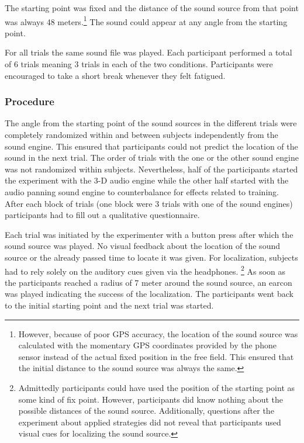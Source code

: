 \documentclass[journal]{IEEEtran}
\begin{document}
The starting point was fixed and the distance of the sound source from that point was always 48 meters.\footnote{However, because of poor GPS accuracy, the location of the sound source was calculated with the momentary GPS coordinates provided by the phone sensor instead of the actual fixed position in the free field. This ensured that the initial distance to the sound source was always the same.} The sound could appear at any angle from the starting point.

For all trials the same sound file was played. Each participant performed a total of 6 trials meaning 3 trials in each of the two conditions. Participants were encouraged to take a short break whenever they felt fatigued.

\subsubsection{Procedure}
The angle from the starting point of the sound sources in the different trials were completely randomized within and between subjects independently from the sound engine. This ensured that participants could not predict the location of the sound in the next trial. The order of trials with the one or the other sound engine was not randomized within subjects. Nevertheless, half of the participants started the experiment with the 3-D audio engine while the other half started with the audio panning sound engine to counterbalance for effects related to training. After each block of trials (one block were 3 trials with one of the sound engines) participants had to fill out a qualitative questionnaire.

Each trial was initiated by the experimenter with a button press after which the sound source was played. No visual feedback about the location of the sound source or the already passed time to locate it was given. For localization, subjects had to rely solely on the auditory cues given via the headphones. \footnote{Admittedly participants could have used the position of the starting point as some kind of fix point. However, participants did know nothing about the possible distances of the sound source. Additionally, questions after the experiment about applied strategies did not reveal that participants used visual cues for localizing the sound source.} As soon as the participants reached a radius of 7 meter around the sound source, an earcon was played indicating the success of the localization. The participants went back to the initial starting point and the next trial was started.
\end{document}
